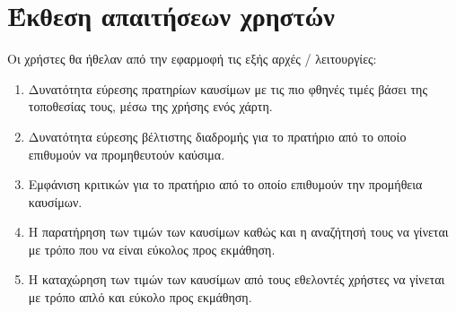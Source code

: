 \section{Έκθεση απαιτήσεων χρηστών}

Οι χρήστες θα ήθελαν από την εφαρμοφή τις εξής αρχές / λειτουργίες:
\begin{enumerate}
	\item Δυνατότητα εύρεσης πρατηρίων καυσίμων με τις πιο φθηνές τιμές βάσει της τοποθεσίας τους, μέσω της χρήσης ενός χάρτη.
	\item Δυνατότητα εύρεσης βέλτιστης διαδρομής για το πρατήριο από το οποίο επιθυμούν να προμηθευτούν καύσιμα.
	\item Εμφάνιση κριτικών για το πρατήριο από το οποίο επιθυμούν την προμήθεια καυσίμων.
	\item Η παρατήρηση των τιμών των καυσίμων καθώς και η αναζήτησή τους να γίνεται με τρόπο που να είναι εύκολος προς εκμάθηση.
	\item Η καταχώρηση των τιμών των καυσίμων από τους εθελοντές χρήστες να γίνεται με τρόπο απλό και εύκολο προς εκμάθηση.
\end{enumerate}
